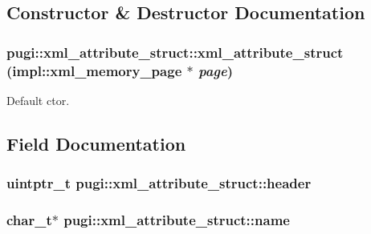 \subsection{Constructor \& Destructor Documentation}
\hypertarget{structpugi_1_1xml__attribute__struct_a57bb21cb72613e746a659efdd6425b94}{
\subsubsection[{xml\_\-attribute\_\-struct}]{\setlength{\rightskip}{0pt plus 5cm}pugi::xml\_\-attribute\_\-struct::xml\_\-attribute\_\-struct (impl::xml\_\-memory\_\-page $\ast$ {\em page})}}
\label{structpugi_1_1xml__attribute__struct_a57bb21cb72613e746a659efdd6425b94}


Default ctor. 

\subsection{Field Documentation}
\hypertarget{structpugi_1_1xml__attribute__struct_a0dca6ca6c129bbf87a7ebaf87f3e12de}{
\subsubsection[{header}]{\setlength{\rightskip}{0pt plus 5cm}uintptr\_\-t {\bf pugi::xml\_\-attribute\_\-struct::header}}}
\label{structpugi_1_1xml__attribute__struct_a0dca6ca6c129bbf87a7ebaf87f3e12de}
\hypertarget{structpugi_1_1xml__attribute__struct_aa886c4aae23a132e1704717721ee2c19}{
\subsubsection[{name}]{\setlength{\rightskip}{0pt plus 5cm}char\_\-t$\ast$ {\bf pugi::xml\_\-attribute\_\-struct::name}}}
\label{structpugi_1_1xml__attribute__struct_aa886c4aae23a132e1704717721ee2c19}


